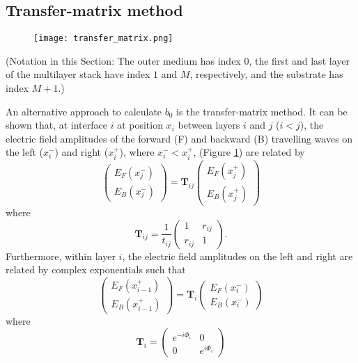 \documentclass[]{article}
\begin{document}
	\subsection{Transfer-matrix method}
	\begin{figure}[H]
		\centering
		\texttt{[image: transfer\_matrix.png]}
		\caption{}
		\label{fig:transfer-matrices}
	\end{figure}

	{\small (Notation in this Section: The outer medium has index $0$, the first and last layer of the multilayer stack have index $1$ and $M$, respectively, and the substrate has index $M+1$.)}
	
	An alternative approach to calculate $b_0$ is the transfer-matrix method. It can be shown that, at interface $i$ at position $x_i$ between layers $i$ and $j$ ($i<j$), the electric field amplitudes of the forward (F) and backward (B) travelling waves on the left ($x_i^-$) and right ($x_i^+$), where $x_i^-<x_i^+$, (Figure \ref{fig:transfer-matrices}) are related by
	\begin{equation}
		\begin{pmatrix}
			E_F(x_j^-)\\
			E_B(x_j^-)
		\end{pmatrix}=
		\mathbf{T}_{ij}
		\begin{pmatrix}
			E_F(x_j^+)\\
			E_B(x_j^+)
		\end{pmatrix}
	\end{equation} 
	where 
	\begin{equation}
		\mathbf{T}_{ij}=
		\frac{1}{t_{ij}}
		\begin{pmatrix}
			1&r_{ij}\\
			r_{ij}&1
		\end{pmatrix}.
	\end{equation}
	Furthermore, within layer $i$, the electric field amplitudes on the left and right are related by complex exponentials such that
	\begin{equation}
		\begin{pmatrix}
			E_F(x_{i-1}^+)\\
			E_B(x_{i-1}^+)
		\end{pmatrix}=
		\mathbf{T}_i
		\begin{pmatrix}
			E_F(x_i^-)\\
			E_B(x_i^-)
		\end{pmatrix}
	\end{equation}
	where 
	\begin{equation}
		\mathbf{T}_i=
		\begin{pmatrix}
			e^{-i\Phi_i}&0\\
			0&e^{i\Phi_i}
		\end{pmatrix}
	\end{equation}
\end{document}
